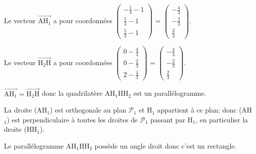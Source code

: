 \documentclass[10pt]{article}
\providecommand{\vect}[1]{\overrightarrow{#1}}
\begin{document}
\begin{enumerate}[resume]
Le vecteur $\vect{\text{AH}_1}$ a pour coordonnées
$\begin{pmatrix}
-\frac{1}{3}-1 \\ \frac{1}{3}-1 \\ \frac{5}{3}-1
\end{pmatrix}$
=
$\begin{pmatrix}
-\frac{4}{3} \\ -\frac{2}{3} \\ \frac{2}{3}
\end{pmatrix}$.

Le vecteur $\vect{\text{H}_2\text{H}}$ a pour coordonnées
$\begin{pmatrix}
0- \frac{4}{3}\\ 0- \frac{2}{3} \\ 2- \frac{4}{3}
\end{pmatrix}$
=
$\begin{pmatrix}
-\frac{4}{3} \\ -\frac{2}{3} \\ \frac{2}{3}
\end{pmatrix}$.

$\vect{\text{AH}_1} = \vect{\text{H}_2\text{H}}$ donc la quadrilatère AH$_1$HH$_2$ est un parallélogramme.

La droite (AH$_1$) est orthogonale au plan $\mathcal{P}_1$ et H$_1$  appartient à ce plan; donc (AH$_1$) est perpendiculaire à toutes les droites de $\mathcal{P}_1$ passant par H$_1$, en particulier la droite (HH$_1$).

Le parallélogramme AH$_1$HH$_2$  possède un angle droit donc c'est un rectangle.

\end{enumerate}

\bigskip
\end{document}
